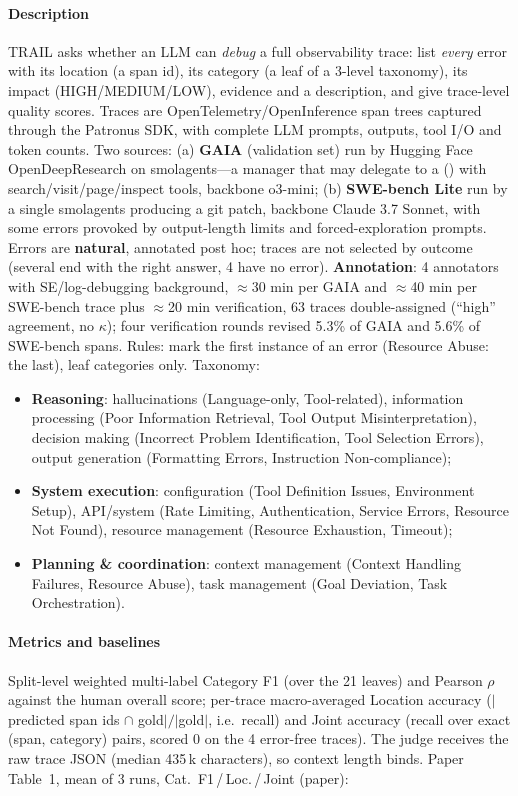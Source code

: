 \paragraph{Description} TRAIL asks whether an LLM can \emph{debug} a full observability trace: list \emph{every} error with its location (a span id), its category (a leaf of a 3-level taxonomy), its impact (HIGH/MEDIUM/LOW), evidence and a description, and give trace-level quality scores. Traces are OpenTelemetry/OpenInference span trees captured through the Patronus SDK, with complete LLM prompts, outputs, tool I/O and token counts. Two sources: (a) \textbf{GAIA} (validation set) run by Hugging Face OpenDeepResearch on smolagents---a manager  that may delegate to a  () with search/visit/page/inspect tools, backbone o3-mini; (b) \textbf{SWE-bench Lite} run by a single smolagents  producing a git patch, backbone Claude 3.7 Sonnet, with some errors provoked by output-length limits and forced-exploration prompts. Errors are \textbf{natural}, annotated post hoc; traces are not selected by outcome (several end with the right answer, 4 have no error). \textbf{Annotation}: 4 annotators with SE/log-debugging background, $\approx$30 min per GAIA and $\approx$40 min per SWE-bench trace plus $\approx$20 min verification, 63 traces double-assigned (``high'' agreement, no $\kappa$); four verification rounds revised 5.3\% of GAIA and 5.6\% of SWE-bench spans. Rules: mark the first instance of an error (Resource Abuse: the last), leaf categories only. Taxonomy:
\begin{itemize}
\item \textbf{Reasoning}: hallucinations (Language-only, Tool-related), information processing (Poor Information Retrieval, Tool Output Misinterpretation), decision making (Incorrect Problem Identification, Tool Selection Errors), output generation (Formatting Errors, Instruction Non-compliance);
\item \textbf{System execution}: configuration (Tool Definition Issues, Environment Setup), API/system (Rate Limiting, Authentication, Service Errors, Resource Not Found), resource management (Resource Exhaustion, Timeout);
\item \textbf{Planning \& coordination}: context management (Context Handling Failures, Resource Abuse), task management (Goal Deviation, Task Orchestration).
\end{itemize}

\paragraph{Metrics and baselines} Split-level weighted multi-label Category F1 (over the 21 leaves) and Pearson $\rho$ against the human overall score; per-trace macro-averaged Location accuracy ($|$predicted span ids $\cap$ gold$|/|$gold$|$, i.e.\ recall) and Joint accuracy (recall over exact (span, category) pairs, scored 0 on the 4 error-free traces). The judge receives the raw trace JSON (median 435\,k characters), so context length binds. Paper Table~1, mean of 3 runs, Cat.\ F1\,/\,Loc.\,/\,Joint (paper):

